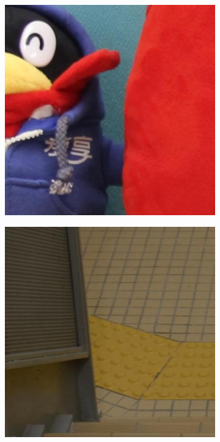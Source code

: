 \begin{figure}
\begin{subfigure}[t]{0.19\textwidth}
    \end{subfigure}
    \hfill
    \begin{subfigure}[t]{0.19\textwidth}
        \centering
        \includegraphics[width=1\textwidth]{images/dataset/Canon600D_4-5_125_1600_toy_16_mean.JPG}
    \end{subfigure}
    \hfill
    \begin{subfigure}[t]{0.19\textwidth}
        \centering
        \includegraphics[width=1\textwidth]{images/dataset/NikonD800_5_125_6400_stair_3_mean.JPG}

\end{subfigure}
\end{figure}
